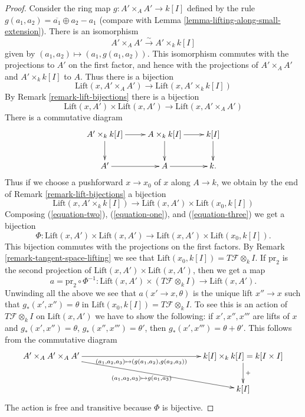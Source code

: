 \documentclass{stacks-project}
\theoremstyle{plain}
\theoremstyle{definition}
\theoremstyle{remark}
\numberwithin{equation}{subsection}
\begin{document}
\begin{proof}
Consider the ring map $g : A' \times_A A' \to k[I]$ defined by the
rule $g(a_1, a_2) = \overline{a_1} \oplus a_2 - a_1$ (compare with
Lemma \ref{lemma-lifting-along-small-extension}).
There is an isomorphism
$$
A' \times_A A' \xrightarrow{\sim} A' \times_k k[I]
$$
given by $(a_1, a_2) \mapsto (a_1, g(a_1, a_2))$.
This isomorphism commutes with the projections to $A'$ on the first
factor, and hence with the projections of
$A' \times_A A'$ and $A' \times_k k[I]$ to $A$. Thus there is a bijection
\begin{equation}
\label{equation-one}
\text{Lift}(x, A' \times_A A')
\longrightarrow
\text{Lift}(x, A' \times_k k[I])
\end{equation}
By Remark \ref{remark-lift-bijections} there is a bijection
\begin{equation}
\label{equation-two}
\text{Lift}(x, A') \times \text{Lift}(x, A')
\longrightarrow
\text{Lift}(x, A' \times_A A')
\end{equation}
There is a commutative diagram
$$
\xymatrix{
A' \times_k k[I] \ar[r] \ar[d] & A \times_k k[I] \ar[r] \ar[d] & k[I] \ar[d] \\
A' \ar[r] & A \ar[r] & k.
}
$$
Thus if we choose a pushforward $x \to x_0$ of $x$ along
$A \to k$, we obtain by the end of
Remark \ref{remark-lift-bijections}
a bijection
\begin{equation}
\label{equation-three}
\text{Lift}(x, A' \times_k k[I])
\longrightarrow
\text{Lift}(x, A') \times \text{Lift}(x_0, k[I])
\end{equation}
Composing (\ref{equation-two}), (\ref{equation-one}), and
(\ref{equation-three})
we get a bijection
$$
\Phi :
\text{Lift}(x, A') \times \text{Lift}(x, A')
\longrightarrow
\text{Lift}(x, A') \times \text{Lift}(x_0, k[I]).
$$
This bijection commutes with the projections on the first factors.
By Remark \ref{remark-tangent-space-lifting}
we see that $\text{Lift}(x_0, k[I]) = T\mathcal{F} \otimes_k I$.
If $\text{pr}_2$ is the second projection of
$\text{Lift}(x, A') \times \text{Lift}(x, A')$, then we get a map
$$
a = \text{pr}_2 \circ \Phi^{-1} :
\text{Lift}(x, A') \times (T\mathcal{F} \otimes_k I)
\longrightarrow
\text{Lift}(x, A').
$$
Unwinding all the above we see that $a(x' \to x, \theta)$
is the unique lift $x'' \to x$ such that $g_*(x', x'') = \theta$
in $\text{Lift}(x_0, k[I]) = T\mathcal{F} \otimes_k I$.
To see this is an action of $T\mathcal{F} \otimes_k I$ on $\text{Lift}(x, A')$
we have to show the following: if $x', x'', x'''$ are lifts of $x$ and
$g_*(x', x'') = \theta$, $g_*(x'', x''') = \theta'$, then
$g_*(x', x''') = \theta + \theta'$. This follows from the commutative
diagram
$$
\xymatrix{
A' \times_A A' \times_A A'
\ar[rrrrr]_-{(a_1, a_2, a_3) \mapsto (g(a_1, a_2), g(a_2, a_3))}
\ar[rrrrrd]_{(a_1, a_2, a_3) \mapsto g(a_1, a_3)} & & & & &
k[I] \times_k k[I] = k[I \times I] \ar[d]^{+} \\
& & & & & k[I]
}
$$
The action is free and transitive because $\Phi$ is bijective.
\end{proof}
\end{document}
